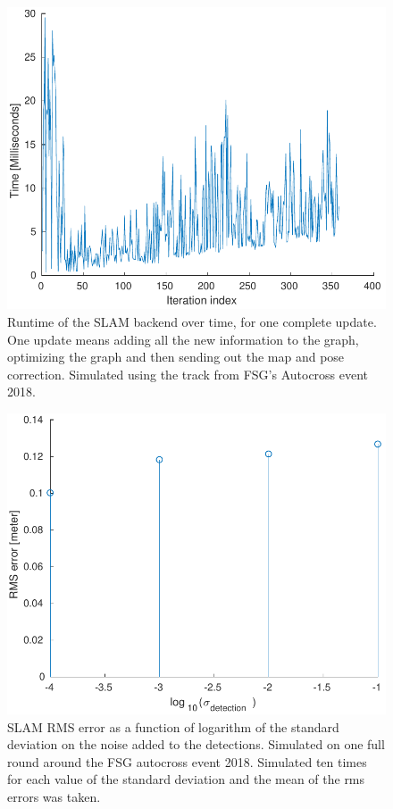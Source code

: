 \begin{figure}
    \centering
    \includegraphics[width=0.8\linewidth]{0_Images/6_Results/BackendTiming.pdf}
    \caption[Runtime of the SLAM backend.]
    {Runtime of the SLAM backend over time, for one complete update. One update means adding all the new information to the graph, optimizing the graph and then sending out the map and pose correction. Simulated using the track from FSG's Autocross event 2018.}
    \label{Fig:BackendTiming}
\end{figure}

\begin{figure}
    \centering
    \includegraphics[width=0.8\linewidth]{0_Images/6_Results/SLAMERMS.pdf}
    \caption[SLAM RMS error as a function of logarithm of the standard deviation on the noise added to the detections.]
    {SLAM RMS error as a function of logarithm of the standard deviation on the noise added to the detections. Simulated on one full round around the FSG autocross event 2018. Simulated ten times for each value of the standard deviation and the mean of the rms errors was taken.}
    \label{Fig:SLAMERMS}
\end{figure}